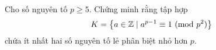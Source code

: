 \ifshowproblem
\begin{problem}\label{example:FRA-2015-RMM-P3}
	Cho số nguyên tố \( p \geq 5 \). Chứng minh rằng tập hợp
	\[
		K = \left\{ a \in \mathbb{Z} \mid a^{p-1} \equiv 1 \ (\mathrm{mod}\ p^2) \right\}
	\]
	chứa ít nhất hai số nguyên tố lẻ phân biệt nhỏ hơn \( p \).
\end{problem}
\fi

\fi